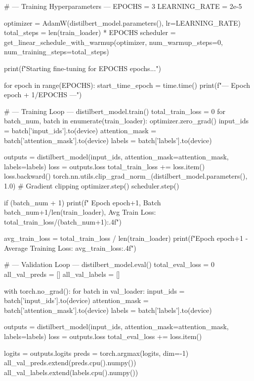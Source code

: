 \begin{ffcode}
    # --- Training Hyperparameters ---
    EPOCHS = 3
    LEARNING_RATE = 2e-5

    optimizer = AdamW(distilbert_model.parameters(), lr=LEARNING_RATE)
    total_steps = len(train_loader) * EPOCHS
    scheduler = get_linear_schedule_with_warmup(optimizer, num_warmup_steps=0, num_training_steps=total_steps)

    print(f"Starting fine-tuning for {EPOCHS} epochs...")

    for epoch in range(EPOCHS):
        start_time_epoch = time.time()
        print(f"\n--- Epoch {epoch + 1}/{EPOCHS} ---")

        # --- Training Loop ---
        distilbert_model.train()
        total_train_loss = 0
        for batch_num, batch in enumerate(train_loader):
            optimizer.zero_grad()
            input_ids = batch['input_ids'].to(device)
            attention_mask = batch['attention_mask'].to(device)
            labels = batch['labels'].to(device)

            outputs = distilbert_model(input_ids, attention_mask=attention_mask, labels=labels)
            loss = outputs.loss
            total_train_loss += loss.item()
            loss.backward()
            torch.nn.utils.clip_grad_norm_(distilbert_model.parameters(), 1.0) # Gradient clipping
            optimizer.step()
            scheduler.step()

            if (batch_num + 1) %
                print(f"  Epoch {epoch+1}, Batch {batch_num+1}/{len(train_loader)}, Avg Train Loss: {total_train_loss/(batch_num+1):.4f}")

        avg_train_loss = total_train_loss / len(train_loader)
        print(f"Epoch {epoch+1} - Average Training Loss: {avg_train_loss:.4f}")

        # --- Validation Loop ---
        distilbert_model.eval()
        total_eval_loss = 0
        all_val_preds = []
        all_val_labels = []

        with torch.no_grad():
            for batch in val_loader:
                input_ids = batch['input_ids'].to(device)
                attention_mask = batch['attention_mask'].to(device)
                labels = batch['labels'].to(device)

                outputs = distilbert_model(input_ids, attention_mask=attention_mask, labels=labels)
                loss = outputs.loss
                total_eval_loss += loss.item()

                logits = outputs.logits
                preds = torch.argmax(logits, dim=-1)
                all_val_preds.extend(preds.cpu().numpy())
                all_val_labels.extend(labels.cpu().numpy())


\end{ffcode}
